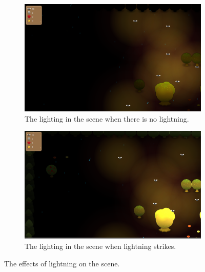 \begin{figure}[h]
        \centering
        \begin{subfigure}[b]{0.492\linewidth}
                \includegraphics[width=\linewidth]{./no_lightning}
                \caption{The lighting in the scene when there is no lightning.}
                \label{fig:lightning}
        \end{subfigure}
        \begin{subfigure}[b]{0.49\linewidth}
                \includegraphics[width=\linewidth]{./lightning}
                \caption{The lighting in the scene when lightning strikes.}
                \label{fig:no_lightning}
        \end{subfigure}
        \caption{The effects of lightning on the scene.}
        \label{fig:lightning_compare}
\end{figure}

